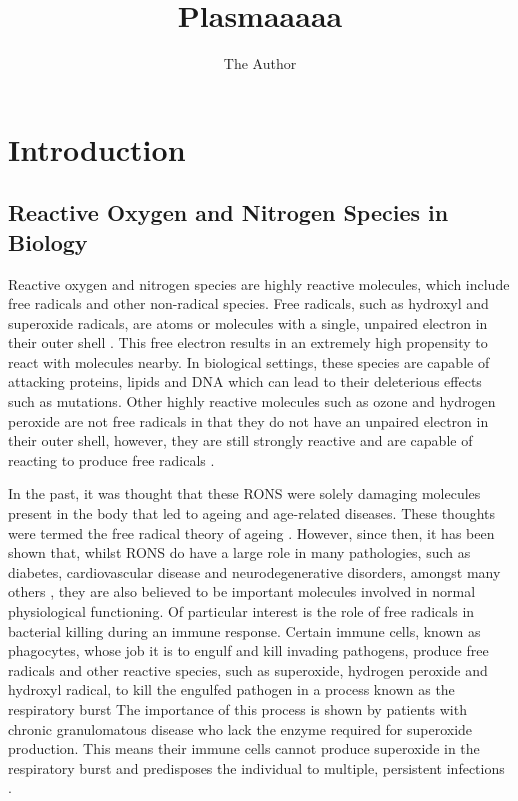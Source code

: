 \documentclass[11pt, oneside]{article}   	%
\title{Plasmaaaaa}
\author{The Author}
\begin{document}
\maketitle
\section{Introduction}

\subsection{Reactive Oxygen and Nitrogen Species in Biology}

Reactive oxygen and nitrogen species are highly reactive molecules, which include free radicals and other non-radical species. 
Free radicals, such as hydroxyl and superoxide radicals, are atoms or molecules with a single, unpaired electron in their outer shell \cite{PhamHuy2008}. 
This free electron results in an extremely high propensity to react with molecules nearby. 
In biological settings, these species are capable of attacking proteins, lipids and DNA \cite{PhamHuy2008} which can lead to their deleterious effects such as mutations.
Other highly reactive molecules such as ozone and hydrogen peroxide are not free radicals in that they do not have an unpaired electron in their outer shell, however, they are still strongly reactive and are capable of reacting to produce free radicals \cite{PhamHuy2008}.

In the past, it was thought that these RONS were solely damaging molecules present in the body that led to ageing and age-related diseases.
These thoughts were termed the free radical theory of ageing \cite{Harman1955}. 
However, since then, it has been shown that, whilst RONS do have a large role in many pathologies, such as diabetes, cardiovascular disease and neurodegenerative disorders, amongst many others \cite{Valko2007}, they are also believed to be important molecules involved in normal physiological functioning.
Of particular interest is the role of free radicals in bacterial killing during an immune response.
Certain immune cells, known as phagocytes, whose job it is to engulf and kill invading pathogens, produce free radicals and other reactive species, such as superoxide, hydrogen peroxide and hydroxyl radical, to kill the engulfed pathogen in a process known as the respiratory burst \cite{Janeway2011}
The importance of this process is shown by patients with chronic granulomatous disease who lack the enzyme required for superoxide production. This means their immune cells cannot produce superoxide in the respiratory burst and predisposes the individual to multiple, persistent infections \cite{Janeway2011, Babior2004}.
\end{document}
